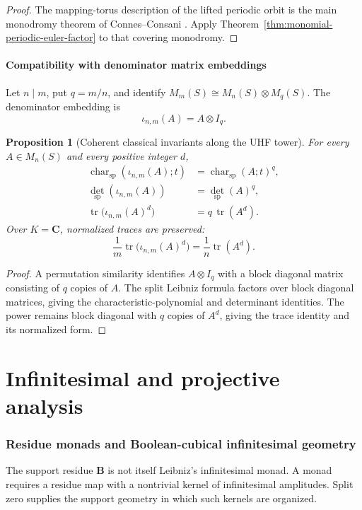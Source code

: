 \documentclass[11pt]{amsart}
\numberwithin{equation}{section}
\newtheorem{proposition}[theorem]{Proposition}
\theoremstyle{definition}
\newcommand{\B}{\mathbf B}
\newcommand{\C}{\mathbf C}
\newcommand{\tr}{\operatorname{tr}}
\newcommand{\detsp}{\operatorname{det}_{\mathrm{sp}}}
\newcommand{\charsp}{\operatorname{char}_{\mathrm{sp}}}
\begin{document}
\begin{proof}
The mapping-torus description of the lifted periodic orbit is the main
monodromy theorem of Connes--Consani \cite{CCKnotsPrimes}.  Apply
Theorem~\ref{thm:monomial-periodic-euler-factor} to that covering
monodromy.
\end{proof}

\subsection{Compatibility with denominator matrix embeddings}

Let $n\mid m$, put $q=m/n$, and identify
$M_m(S)\cong M_n(S)\otimes M_q(S)$.  The denominator embedding is
\[
\iota_{n,m}(A)=A\otimes I_q.
\]

\begin{proposition}[Coherent classical invariants along the UHF tower]
\label{prop:uhf-invariant-compatibility}
For every $A\in M_n(S)$ and every positive integer $d$,
\begin{align*}
\charsp(\iota_{n,m}(A);t)&=\charsp(A;t)^q,\\
\detsp(\iota_{n,m}(A))&=\detsp(A)^q,\\
\tr\bigl(\iota_{n,m}(A)^d\bigr)&=q\,\tr(A^d).
\end{align*}
Over $K=\C$, normalized traces are preserved:
\[
\frac1m\tr\bigl(\iota_{n,m}(A)^d\bigr)
=
\frac1n\tr(A^d).
\]
\end{proposition}

\begin{proof}
A permutation similarity identifies $A\otimes I_q$ with a block diagonal
matrix consisting of $q$ copies of $A$.  The split Leibniz formula factors
over block diagonal matrices, giving the characteristic-polynomial and
determinant identities.  The power remains block diagonal with $q$ copies
of $A^d$, giving the trace identity and its normalized form.
\end{proof}

\part{Infinitesimal and projective analysis}

\section{Residue monads and Boolean-cubical infinitesimal geometry}

The support residue $\B$ is not itself Leibniz's infinitesimal monad.  A monad requires a residue map with a nontrivial kernel of infinitesimal amplitudes.  Split zero supplies the support geometry in which such kernels are organized.
\end{document}
